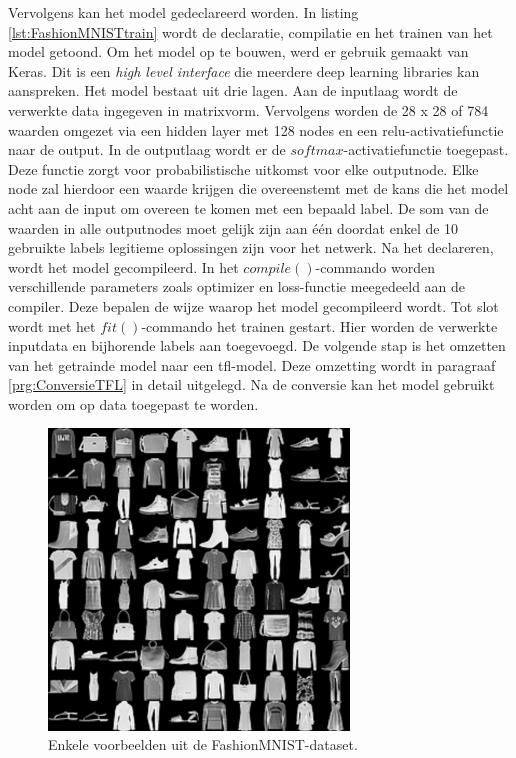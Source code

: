 			Vervolgens kan het model gedeclareerd worden. In listing \ref{lst:FashionMNISTtrain} wordt de declaratie, compilatie en het trainen van het model getoond. Om het model op te bouwen, werd er gebruik gemaakt van Keras. Dit is een \textit{high level interface} die meerdere deep learning libraries kan aanspreken. Het model bestaat uit drie lagen. Aan de inputlaag wordt de verwerkte data ingegeven in matrixvorm. Vervolgens worden de 28 x 28 of 784 waarden omgezet via een hidden layer met 128 nodes en een relu-activatiefunctie naar de output. In de outputlaag wordt er de $softmax$-activatiefunctie toegepast. Deze functie zorgt voor probabilistische uitkomst voor elke outputnode. Elke node zal hierdoor een waarde krijgen die overeenstemt met de kans die het model acht aan de input om overeen te komen met een bepaald label. De som van de waarden in alle outputnodes moet gelijk zijn aan \'e\'en doordat enkel de 10 gebruikte labels legitieme oplossingen zijn voor het netwerk. Na het declareren, wordt het model gecompileerd. In het $compile()$-commando worden verschillende parameters zoals optimizer en loss-functie meegedeeld aan de compiler. Deze bepalen de wijze waarop het model gecompileerd wordt. Tot slot wordt met het $fit()$-commando het trainen gestart. Hier worden de verwerkte inputdata en bijhorende labels aan toegevoegd. De volgende stap is het omzetten van het getrainde model naar een \gls{tfl}-model. Deze omzetting wordt in paragraaf \ref{prg:ConversieTFL} in detail uitgelegd. Na de conversie kan het model gebruikt worden om op data toegepast te worden. 
			
			
			\begin{figure}
				\centering
				\includegraphics[width=80mm]{afbeeldingen/FashionMNIST_kledij.PNG}
				\caption[Enkele voorbeelden uit de FashionMNIST-dataset.]{Enkele voorbeelden uit de FashionMNIST-dataset\cite{bron:fashionmnist}.}
				\label{fig:FashionMNIST-kledij}
			\end{figure}

